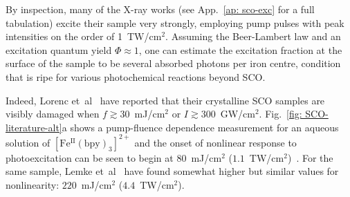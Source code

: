 %
By inspection, many of the X-ray works (see App.~\ref{ap: sco-exc} for a full tabulation)
excite their sample very strongly,
employing pump pulses with peak intensities on the order of 1~TW/cm$^2$.
Assuming the Beer-Lambert law and an excitation quantum yield $\Phi \approx 1$,
one can estimate the excitation fraction at the surface of the sample
to be several absorbed photons per iron centre,
condition that is ripe for various photochemical reactions beyond SCO.


Indeed, Lorenc et~al~\cite{Lorenc2009, Collet2012a, Collet2012b, Lorenc2012, Kaszub2013}
have reported that their crystalline SCO samples are visibly damaged
when $f \gtrsim 30$~mJ/cm$^2$ or $I \gtrsim 300$~GW/cm$^2$.
%
Fig.~\ref{fig: SCO-literature-alt}a shows a pump-fluence dependence measurement for
an aqueous solution of $\mathrm{[Fe^{II}(bpy)_3]^{2+}}$
and the onset of nonlinear response to photoexcitation
can be seen to begin at $80$~mJ/cm$^2$ ($1.1$~TW/cm$^2$)~\cite{Zhang2014}.
For the same sample, Lemke et~al~\cite{Lemke2017} have found somewhat higher but similar
values for nonlinearity: $220$~mJ/cm$^2$ ($4.4$~TW/cm$^2$).
%
